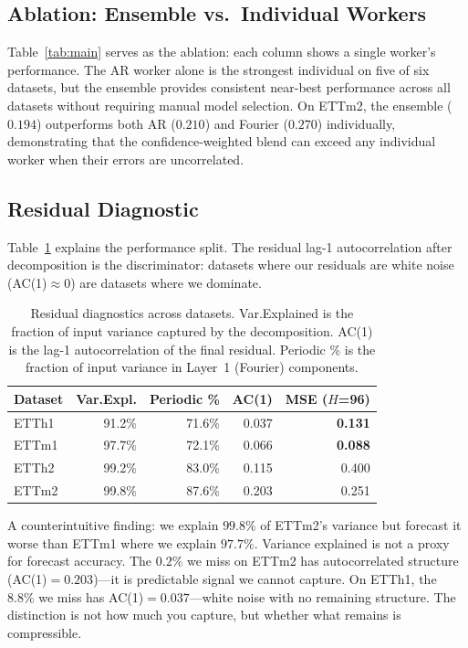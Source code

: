 \documentclass[sigconf,nonacm]{acmart}
\begin{document}
\subsection{Ablation: Ensemble vs.\ Individual Workers}

Table~\ref{tab:main} serves as the ablation: each column shows a single worker's performance. The AR worker alone is the strongest individual on five of six datasets, but the ensemble provides consistent near-best performance across all datasets without requiring manual model selection. On ETTm2, the ensemble ($0.194$) outperforms both AR ($0.210$) and Fourier ($0.270$) individually, demonstrating that the confidence-weighted blend can exceed any individual worker when their errors are uncorrelated.

\subsection{Residual Diagnostic}

Table~\ref{tab:residual} explains the performance split. The residual lag-1 autocorrelation after decomposition is the discriminator: datasets where our residuals are white noise (AC(1)$\approx 0$) are datasets where we dominate.

\begin{table}[t]
\caption{Residual diagnostics across datasets. Var.\@ Explained is the fraction of input variance captured by the decomposition. AC(1) is the lag-1 autocorrelation of the final residual. Periodic \% is the fraction of input variance in Layer~1 (Fourier) components.}
\label{tab:residual}
\centering
\small
\begin{tabular}{l rrr r}
\toprule
Dataset & Var.\@ Expl. & Periodic \% & AC(1) & MSE ($H$=96) \\
\midrule
ETTh1 & 91.2\% & 71.6\% & 0.037 & \textbf{0.131} \\
ETTm1 & 97.7\% & 72.1\% & 0.066 & \textbf{0.088} \\
ETTh2 & 99.2\% & 83.0\% & 0.115 & 0.400 \\
ETTm2 & 99.8\% & 87.6\% & 0.203 & 0.251 \\
\bottomrule
\end{tabular}
\end{table}

A counterintuitive finding: we explain $99.8\%$ of ETTm2's variance but forecast it worse than ETTm1 where we explain $97.7\%$. Variance explained is not a proxy for forecast accuracy. The $0.2\%$ we miss on ETTm2 has autocorrelated structure (AC(1)$= 0.203$)---it is predictable signal we cannot capture. On ETTh1, the $8.8\%$ we miss has AC(1)$= 0.037$---white noise with no remaining structure. The distinction is not how much you capture, but whether what remains is compressible.
\end{document}
